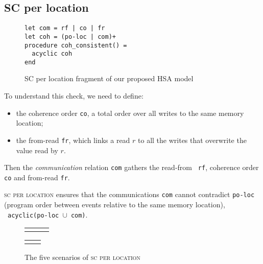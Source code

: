 \documentclass[a4paper]{article}
\begin{document}

\subsection{SC per location \label{sec:sc-per-loc}}

\begin{figure}[!h]
\begin{verbatim}
let com = rf | co | fr
let coh = (po-loc | com)+
procedure coh_consistent() =
  acyclic coh
end
\end{verbatim}
\vspace*{-4mm}
\caption{SC per location fragment of our proposed HSA model}
\end{figure}

To understand this check, we need to define:
\begin{itemize}
\item the coherence order {\tt co}, a total order over all writes to the same memory location;
\item the from-read {\tt fr}, which links a read $r$ to all the writes that
overwrite the value read by $r$.
\end{itemize}

Then the \emph{communication} relation {\tt com} gathers the read-from {\tt
rf}, coherence order {\tt co} and from-read {\tt fr}.

\textsc{sc per location} ensures that the communications {\tt com} cannot
contradict {\tt po-loc} (program order between events relative to the same
memory location), \ie \ {\tt acyclic(po-loc $\cup$ com)}. 

\begin{figure}[!h]
\begin{center}
\begin{tabular}{m{.3\linewidth} m{.3\linewidth} m{.3\linewidth}}
&
&
\end{tabular}
\end{center}
\begin{center}
\begin{tabular}{m{.5\linewidth} m{.5\linewidth}}
&
\end{tabular}
\end{center}
\vspace*{-5mm}
\caption{The five scenarios of \textsc{sc per location}\label{fig:co}}
\end{figure}
\end{document}
